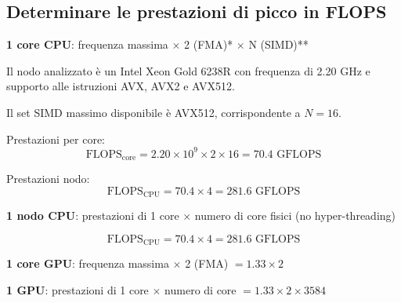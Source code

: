 \documentclass[11pt,a4paper]{article}
\begin{document}
\subsection{Determinare le prestazioni di picco in FLOPS}

\textbf{1 core CPU}: frequenza massima $\times$ 2 (FMA)* $\times$ N (SIMD)**

Il nodo analizzato è un Intel Xeon Gold 6238R con frequenza di 2.20 GHz e supporto alle istruzioni AVX, AVX2 e AVX512.

Il set SIMD massimo disponibile è AVX512, corrispondente a $N=16$.

Prestazioni per core:
\begin{equation}
\text{FLOPS}_{\text{core}} = 2.20 \times 10^9 \times 2 \times 16 = 70.4 \text{ GFLOPS}
\end{equation}

Prestazioni nodo:
\begin{equation}
\text{FLOPS}_{\text{CPU}} = 70.4 \times 4 = 281.6 \text{ GFLOPS}
\end{equation}

\textbf{1 nodo CPU}: prestazioni di 1 core $\times$ numero di core fisici (no hyper-threading)

\begin{equation}
\text{FLOPS}_{\text{CPU}} = 70.4 \times 4 = 281.6 \text{ GFLOPS}
\end{equation}

\textbf{1 core GPU}: frequenza massima $\times$ 2 (FMA) $= 1.33 \times 2$

\textbf{1 GPU}: prestazioni di 1 core $\times$ numero di core $= 1.33 \times 2 \times 3584$
\end{document}
